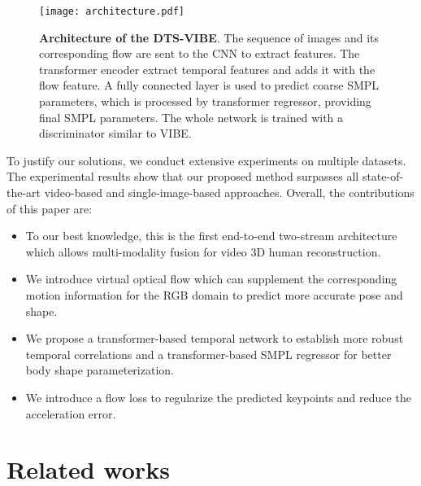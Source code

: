 \documentclass[10pt,twocolumn,letterpaper]{article}
\begin{document}
\begin{figure*}[t]
\centering
\texttt{[image: architecture.pdf]}


\caption{\textbf{Architecture of the DTS-VIBE}. The sequence of images and its corresponding flow are sent to the CNN to extract features. The transformer encoder extract temporal features and adds it with the flow feature. A fully connected layer is used to predict coarse SMPL parameters, which is processed by transformer regressor, providing final SMPL parameters. The whole network is trained with a discriminator similar to VIBE.}
\label{architecture}
\end{figure*}
To justify our solutions, we conduct extensive experiments on multiple datasets. The experimental results show that our proposed method surpasses all state-of-the-art video-based and single-image-based approaches. Overall, the contributions of this paper are: 
\begin{itemize}
    \item To our best knowledge, this is the first end-to-end two-stream architecture which allows multi-modality fusion for video 3D human reconstruction.
\item We introduce virtual optical flow which can supplement the corresponding motion information for the RGB domain to predict more accurate pose and shape.  
    \item We propose a transformer-based temporal network to establish more robust temporal correlations and a transformer-based SMPL regressor for better body shape parameterization. 
    \item We introduce a flow loss to regularize the predicted keypoints and reduce the acceleration error.
\end{itemize}

\section{Related works}
\end{document}
